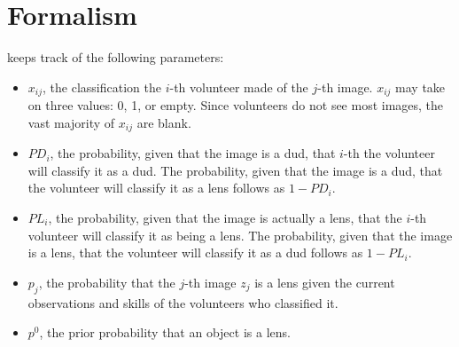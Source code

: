 \documentclass[useAMS,usenatbib,a4paper]{mn2e}
\begin{document}

\section{Formalism}
\label{sec:formalism}

\sw keeps track of the following parameters:
\begin{itemize}
  \item{$x_{ij}$, the classification the $i$-th volunteer made of the $j$-th
      image. $x_{ij}$ may take on three values:
      0, 1, or empty. Since volunteers do not see most images, the vast
    majority of $x_{ij}$ are blank.}
    \item{$PD_{i}$, the probability, given that the image is a dud, that
        $i$-th the volunteer will classify it as a dud. The
      probability, given that the image is a dud, that the volunteer will
    classify it as a lens follows as $1 - PD_{i}$.}
  \item{$PL_{i}$, the probability, given that the image is actually a
      lens, that the $i$-th volunteer will classify it as being a lens. The
      probability, given that the image is a lens, that the volunteer will
    classify it as a dud follows as $1 - PL_{i}$.}
  \item{$p_j$, the probability that
      the $j$-th image $z_{j}$ is a lens given the current observations and skills of the
  volunteers who classified it.}
  \item{$p^{0}$, the prior probability that an object is a lens.}
\end{itemize}

\end{document}
